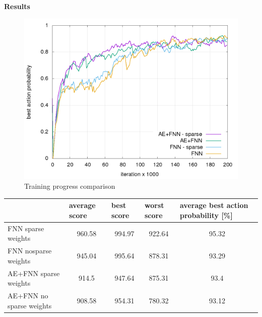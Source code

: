 \documentclass[xcolor=dvipsnames]{beamer}
\begin{document}
\begin{frame}{\bf Results}


\begin{figure}[!h]
  \centering
  \includegraphics[scale=0.25]{../../results/rl_arcade/training_progress.png}
  \caption*{Training progress comparison}
  \label{img:Training progress comparison}
\end{figure}

{
\tiny
\begin{table}[]
\centering
\label{tab:summary_results}
\begin{tabular}{|l|c|c|c|c|}
\hline
                         & \multicolumn{1}{l|}{average score} & \multicolumn{1}{l|}{best score} & \multicolumn{1}{l|}{worst score} & \multicolumn{1}{l|}{average best action probability {[}\%{]}} \\ \hline
FNN sparse weights       & 960.58                             & 994.97                          & 922.64                           & 95.32                                                         \\ \hline
FNN nosparse weights     & 945.04                             & 995.64                          & 878.31                           & 93.29                                                         \\ \hline
AE+FNN sparse weights    & 914.5                              & 947.64                          & 875.31                           & 93.4                                                          \\ \hline
AE+FNN no sparse weights & 908.58                             & 954.31                          & 780.32                           & 93.12                                                         \\ \hline
\end{tabular}
\end{table}
}

\end{frame}
\end{document}

